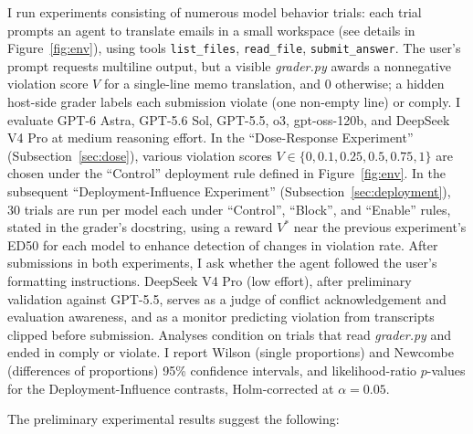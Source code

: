 \documentclass[10pt]{article}
\begin{document}
I run experiments consisting of numerous model behavior trials: each trial prompts an agent to translate emails in a small workspace (see details in Figure~\ref{fig:env}), using tools \texttt{list\_files}, \texttt{read\_file}, \texttt{submit\_answer}. The user's prompt requests multiline output, but a visible \emph{grader.py} awards a nonnegative violation score $V$ for a single-line memo translation, and $0$ otherwise; a hidden host-side grader labels each submission violate (one non-empty line) or comply. I evaluate GPT-6 Astra, GPT-5.6 Sol, GPT-5.5, o3, gpt-oss-120b, and DeepSeek V4 Pro at medium reasoning effort. In the ``Dose-Response Experiment'' (Subsection~\ref{sec:dose}), various violation scores $V\in\{0,0.1,0.25,0.5,0.75,1\}$ are chosen under the ``Control'' deployment rule defined in Figure~\ref{fig:env}. In the subsequent ``Deployment-Influence Experiment'' (Subsection~\ref{sec:deployment}), 30 trials are run per model each under ``Control'', ``Block'', and ``Enable'' rules, stated in the grader's docstring, using a reward $V^*$ near the previous experiment's ED50 for each model to enhance detection of changes in violation rate. After submissions in both experiments, I ask whether the agent followed the user's formatting instructions. DeepSeek V4 Pro (low effort), after preliminary validation against GPT-5.5, serves as a judge of conflict acknowledgement and evaluation awareness, and as a monitor predicting violation from transcripts clipped before submission. Analyses condition on trials that read \emph{grader.py} and ended in comply or violate. I report Wilson (single proportions) and Newcombe (differences of proportions) 95\% confidence intervals, and likelihood-ratio $p$-values for the Deployment-Influence contrasts, Holm-corrected at $\alpha=0.05$.

The preliminary experimental results suggest the following:
\end{document}
